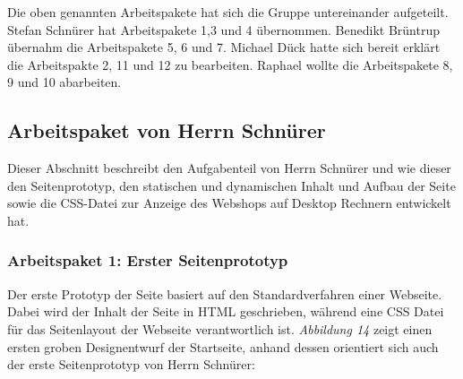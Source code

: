 Die oben genannten Arbeitspakete hat sich die Gruppe untereinander aufgeteilt. Stefan Schnürer hat Arbeitspakete 1,3 und 4 übernommen. Benedikt Brüntrup übernahm die Arbeitspakete 5, 6 und 7. Michael Dück hatte sich bereit erklärt die Arbeitspakte 2, 11 und 12 zu bearbeiten. Raphael wollte die Arbeitspakete 8, 9 und 10 abarbeiten.




\subsection{Arbeitspaket von Herrn Schnürer}

Dieser Abschnitt beschreibt den Aufgabenteil von Herrn Schnürer und wie dieser den Seitenprototyp, den statischen und dynamischen Inhalt und Aufbau der Seite sowie die CSS-Datei zur Anzeige des Webshops auf Desktop Rechnern entwickelt hat.


\subsubsection{Arbeitspaket 1: Erster Seitenprototyp}

Der erste Prototyp der Seite basiert auf den Standardverfahren einer Webseite. Dabei wird der Inhalt der Seite in HTML geschrieben, während eine CSS Datei für das Seitenlayout der Webseite verantwortlich ist. \textit{Abbildung 14} zeigt einen ersten groben Designentwurf der Startseite, anhand dessen orientiert sich auch der erste Seitenprototyp von Herrn Schnürer:

